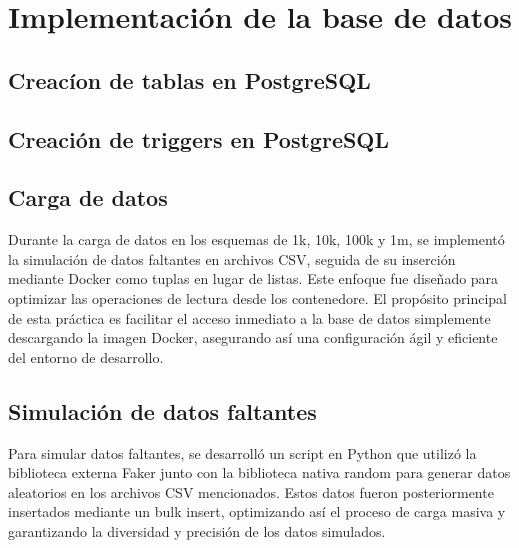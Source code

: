 \section{Implementación de la base de datos}
\subsection{Creacíon de tablas en PostgreSQL}

\subsection{Creación de triggers en PostgreSQL}

\subsection{Carga de datos}{Durante la carga de datos en los esquemas de 1k, 10k, 100k y 1m, se implementó la simulación de datos faltantes en archivos CSV, seguida de su inserción mediante Docker como tuplas en lugar de listas. Este enfoque fue diseñado para optimizar las operaciones de lectura desde los contenedore. El propósito principal de esta práctica es facilitar el acceso inmediato a la base de datos simplemente descargando la imagen Docker, asegurando así una configuración ágil y eficiente del entorno de desarrollo.}
\subsection{Simulación de datos faltantes}{Para simular datos faltantes, se desarrolló un script en Python que utilizó la biblioteca externa Faker junto con la biblioteca nativa random para generar datos aleatorios en los archivos CSV mencionados. Estos datos fueron posteriormente insertados mediante un bulk insert, optimizando así el proceso de carga masiva y garantizando la diversidad y precisión de los datos simulados.}